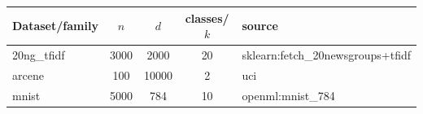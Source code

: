 \begin{tabular}{lcccl}
\toprule
Dataset/family & $n$ & $d$ & classes/$k$ & source \\
\midrule
20ng\_tfidf & 3000 & 2000 & 20 & sklearn:fetch\_20newsgroups+tfidf \\
arcene & 100 & 10000 & 2 & uci \\
mnist & 5000 & 784 & 10 & openml:mnist\_784 \\
\bottomrule
\end{tabular}
